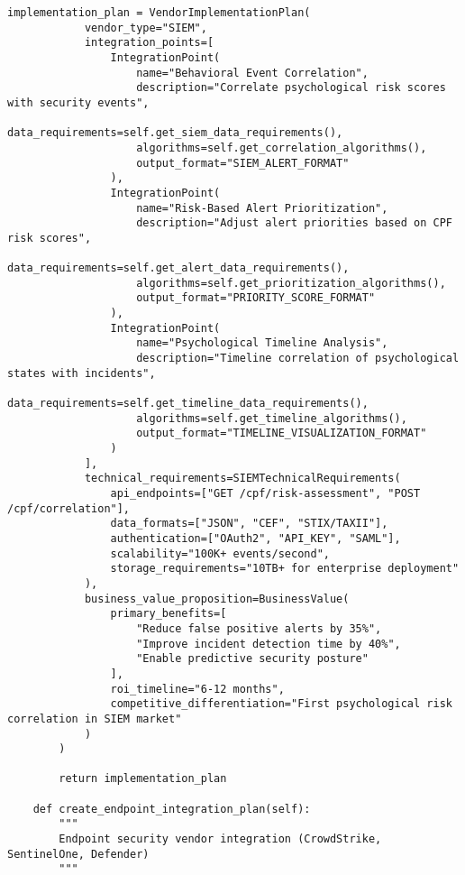 \documentclass[10pt,twocolumn]{IEEEtran}
\begin{document}
\begin{lstlisting}[caption={Vendor Integration Framework}]
        implementation_plan = VendorImplementationPlan(
            vendor_type="SIEM",
            integration_points=[
                IntegrationPoint(
                    name="Behavioral Event Correlation",
                    description="Correlate psychological risk scores with security events",
                    data_requirements=self.get_siem_data_requirements(),
                    algorithms=self.get_correlation_algorithms(),
                    output_format="SIEM_ALERT_FORMAT"
                ),
                IntegrationPoint(
                    name="Risk-Based Alert Prioritization",
                    description="Adjust alert priorities based on CPF risk scores",
                    data_requirements=self.get_alert_data_requirements(),
                    algorithms=self.get_prioritization_algorithms(),
                    output_format="PRIORITY_SCORE_FORMAT"
                ),
                IntegrationPoint(
                    name="Psychological Timeline Analysis",
                    description="Timeline correlation of psychological states with incidents",
                    data_requirements=self.get_timeline_data_requirements(),
                    algorithms=self.get_timeline_algorithms(),
                    output_format="TIMELINE_VISUALIZATION_FORMAT"
                )
            ],
            technical_requirements=SIEMTechnicalRequirements(
                api_endpoints=["GET /cpf/risk-assessment", "POST /cpf/correlation"],
                data_formats=["JSON", "CEF", "STIX/TAXII"],
                authentication=["OAuth2", "API_KEY", "SAML"],
                scalability="100K+ events/second",
                storage_requirements="10TB+ for enterprise deployment"
            ),
            business_value_proposition=BusinessValue(
                primary_benefits=[
                    "Reduce false positive alerts by 35%",
                    "Improve incident detection time by 40%",
                    "Enable predictive security posture"
                ],
                roi_timeline="6-12 months",
                competitive_differentiation="First psychological risk correlation in SIEM market"
            )
        )
        
        return implementation_plan
    
    def create_endpoint_integration_plan(self):
        """
        Endpoint security vendor integration (CrowdStrike, SentinelOne, Defender)
        """
        

\end{lstlisting}
\end{document}
